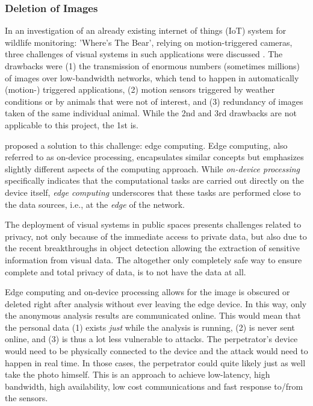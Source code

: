 \subsubsection{Deletion of Images}
\label{sec:deletion_of_images}
In an investigation of an already existing internet of things (IoT) system for wildlife monitoring: 'Where's The Bear', relying on motion-triggered cameras, three challenges of visual systems in such applications were discussed \cite{el2017WTB}. The drawbacks were (1) the transmission of enormous numbers (sometimes millions) of images over low-bandwidth networks, which tend to happen in automatically (motion-) triggered applications, (2) motion sensors triggered by weather conditions or by animals that were not of interest, and (3) redundancy of images taken of the same individual animal. While the 2nd and 3rd drawbacks are not applicable to this project, the 1st is.

\citeauthor{el2017WTB} proposed a solution to this challenge: edge computing. Edge computing, also referred to as on-device processing, encapsulates similar concepts but emphasizes slightly different aspects of the computing approach. While \textit{on-device processing} specifically indicates that the computational tasks are carried out directly on the device itself, \textit{edge computing} underscores that these tasks are performed close to the data sources, i.e., at the \textit{edge} of the network.

The deployment of visual systems in public spaces presents challenges related to privacy, not only because of the immediate access to private data, but also due to the recent breakthroughs in object detection allowing the extraction of sensitive information from visual data. The altogether only completely safe way to ensure complete and total privacy of data, is to not have the data at all.

Edge computing and on-device processing allows for the image is obscured or deleted right after analysis without ever leaving the edge device. In this way, only the anonymous analysis results are communicated online. This would mean that the personal data (1) exists \textit{just} while the analysis is running, (2) is never sent online, and (3) is thus a lot less vulnerable to attacks. The perpetrator's device would need to be physically connected to the device and the attack would need to happen in real time. In those cases, the perpetrator could quite likely just as well take the photo himself. This is an approach to achieve low-latency, high bandwidth, high availability, low cost communications and fast response to/from the sensors.

